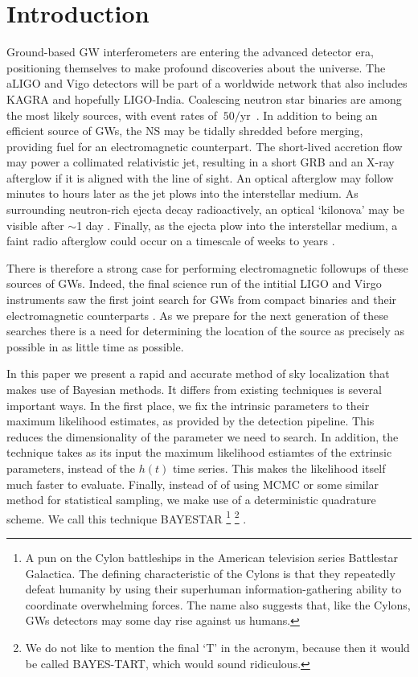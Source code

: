 \documentclass{iopart}
\let\oldmarginpar\marginpar
\renewcommand\marginpar[1]{\-\oldmarginpar[\raggedleft\footnotesize #1]%
{\raggedright\footnotesize #1}}
\begin{document}
\section{Introduction}

Ground-based \ac{GW} interferometers are entering the advanced detector era, positioning themselves to make profound discoveries about the universe. The \ac{aLIGO} and Vigo detectors will be part of a worldwide network that also includes KAGRA and hopefully LIGO-India. Coalescing neutron star binaries are among the most likely sources, with event rates of $~ 50/\mathrm{yr}$~\cite{rates}.%
%
\marginpar{Check that number.}
%
In addition to being an efficient source of \acp{GW}, the \ac{NS} may be tidally shredded before merging, providing fuel for an electromagnetic counterpart. The short-lived accretion flow may power a collimated relativistic jet, resulting in a short \ac{GRB} and an X-ray afterglow if it is aligned with the line of sight. An optical afterglow may follow minutes to hours later as the jet plows into the interstellar medium. As surrounding neutron-rich ejecta decay radioactively, an optical `kilonova' may be visible after $\sim$1 day \cite{metzger:2010}. Finally, as the ejecta plow into the interstellar medium, a faint radio afterglow could occur on a timescale of weeks to years \cite{Nakar:2011cw}.

There is therefore a strong case for performing electromagnetic followups of these sources of \acp{GW}. Indeed, the final science run of the intitial LIGO and Virgo instruments saw the first joint search for \acp{GW} from compact binaries and their electromagnetic counterparts \cite{abadie2012first}.  As we prepare for the next generation of these searches there is a need for determining the location of the source as precisely as possible in as little time as possible.

In this paper we present a rapid and accurate method of sky localization that makes use of Bayesian methods. It differs from existing techniques is several important ways.  In the first place, we fix the intrinsic parameters to their maximum likelihood estimates, as provided by the detection pipeline.  This reduces the dimensionality of the parameter we need to search. In addition, the technique takes as its input the maximum likelihood estiamtes of the extrinsic parameters, instead of the $h(t)$ time series. This makes the likelihood itself much faster to evaluate. Finally, instead of of using \ac{MCMC} or some similar method for statistical sampling, we make use of a deterministic quadrature scheme. We call this technique \ac{BAYESTAR}%
%
\footnote{A pun on the Cylon battleships in the American television series Battlestar Galactica. The defining characteristic of the Cylons is that they repeatedly defeat humanity by using their superhuman information\nobreakdashes-gathering ability to coordinate overwhelming forces. The name also suggests that, like the Cylons, \acp{GW} detectors may some day rise against us humans.}%
%
\footnote{We do not like to mention the final `T' in the acronym, because then it would be called BAYES\nobreakdashes-TART, which would sound ridiculous.}%
.
\end{document}
